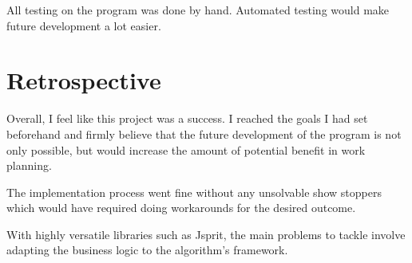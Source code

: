 All testing on the program was done by hand. Automated testing would make future development a lot easier.


\section{Retrospective}

Overall, I feel like this project was a success. I reached the goals I had set beforehand and firmly believe that the future development of the program is not only possible, but would increase the amount of potential benefit in work planning.

The implementation process went fine without any unsolvable show stoppers which would have required doing workarounds for the desired outcome.  

With highly versatile libraries such as Jsprit, the main problems to tackle involve adapting the business logic to the algorithm's framework.  